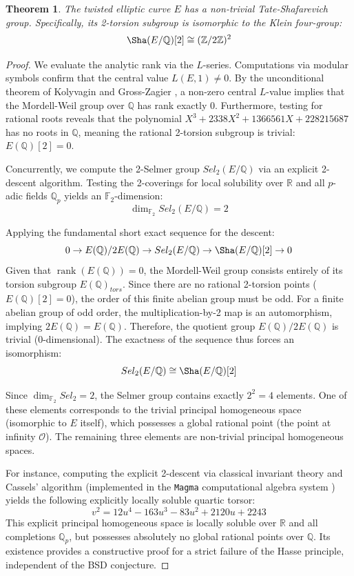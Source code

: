 \documentclass[11pt,a4paper]{article}
\DeclareMathOperator{\rank}{rank}
\newtheorem{theorem}{Theorem}[section]
\begin{document}
\begin{theorem}
The twisted elliptic curve $E$ has a non-trivial Tate-Shafarevich group. Specifically, its 2-torsion subgroup is isomorphic to the Klein four-group:
$$\Sha(E/\mathbb{Q})[2] \cong (\mathbb{Z}/2\mathbb{Z})^2$$
\end{theorem}
\begin{proof}
We evaluate the analytic rank via the $L$-series. Computations via modular symbols confirm that the central value $L(E, 1) \neq 0$. By the unconditional theorem of Kolyvagin \cite{Kolyvagin} and Gross-Zagier \cite{GrossZagier}, a non-zero central $L$-value implies that the Mordell-Weil group over $\mathbb{Q}$ has rank exactly $0$. Furthermore, testing for rational roots reveals that the polynomial $X^3 + 2338X^2 + 1366561X + 228215687$ has no roots in $\mathbb{Q}$, meaning the rational 2-torsion subgroup is trivial: $E(\mathbb{Q})[2] = 0$.

Concurrently, we compute the 2-Selmer group $Sel_2(E/\mathbb{Q})$ via an explicit 2-descent algorithm. Testing the 2-coverings for local solubility over $\mathbb{R}$ and all $p$-adic fields $\mathbb{Q}_p$ yields an $\mathbb{F}_2$-dimension:
$$\dim_{\mathbb{F}_2} Sel_2(E/\mathbb{Q}) = 2$$

Applying the fundamental short exact sequence for the descent:
$$0 \to E(\mathbb{Q})/2E(\mathbb{Q}) \to Sel_2(E/\mathbb{Q}) \to \Sha(E/\mathbb{Q})[2] \to 0$$
Given that $\rank(E(\mathbb{Q})) = 0$, the Mordell-Weil group consists entirely of its torsion subgroup $E(\mathbb{Q})_{tors}$. Since there are no rational 2-torsion points ($E(\mathbb{Q})[2] = 0$), the order of this finite abelian group must be odd. For a finite abelian group of odd order, the multiplication-by-2 map is an automorphism, implying $2E(\mathbb{Q}) = E(\mathbb{Q})$. Therefore, the quotient group $E(\mathbb{Q})/2E(\mathbb{Q})$ is trivial ($0$-dimensional). The exactness of the sequence thus forces an isomorphism:
$$Sel_2(E/\mathbb{Q}) \cong \Sha(E/\mathbb{Q})[2]$$

Since $\dim_{\mathbb{F}_2} Sel_2 = 2$, the Selmer group contains exactly $2^2 = 4$ elements. One of these elements corresponds to the trivial principal homogeneous space (isomorphic to $E$ itself), which possesses a global rational point (the point at infinity $\mathcal{O}$). The remaining three elements are non-trivial principal homogeneous spaces.

For instance, computing the explicit 2-descent via classical invariant theory and Cassels' algorithm \cite{Cassels} (implemented in the \texttt{Magma} computational algebra system \cite{Magma}) yields the following explicitly locally soluble quartic torsor:
$$v^2 = 12u^4 - 163u^3 - 83u^2 + 2120u + 2243$$
This explicit principal homogeneous space is locally soluble over $\mathbb{R}$ and all completions $\mathbb{Q}_p$, but possesses absolutely no global rational points over $\mathbb{Q}$. Its existence provides a constructive proof for a strict failure of the Hasse principle, independent of the BSD conjecture.
\end{proof}
\end{document}
